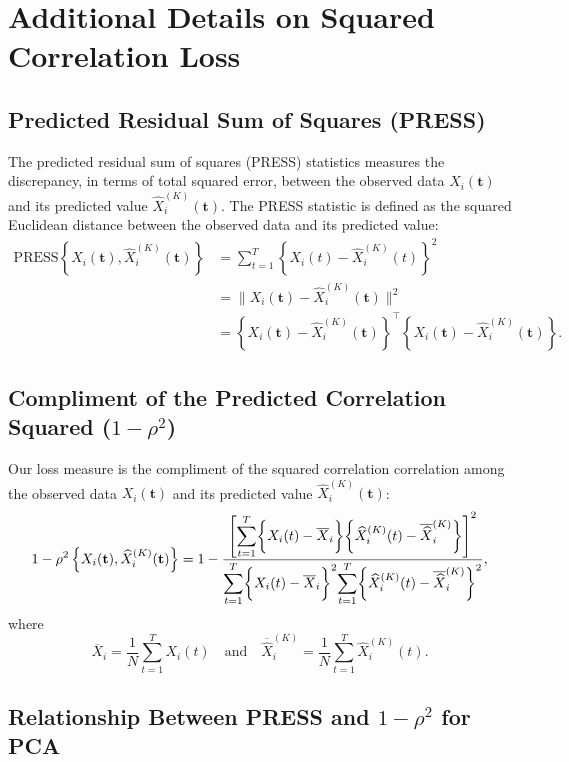 \section{Additional Details on Squared Correlation Loss} \label{sec:squared-correlation}


\subsection{Predicted Residual Sum of Squares (PRESS)}

The predicted residual sum of squares (PRESS) statistics measures the discrepancy, in terms of total squared error, between the observed data $X_i (\mathbf{t})$ and its predicted value $\widehat{X}^{(K)}_{i} (\mathbf{t})$. 
The PRESS statistic is defined as the squared Euclidean distance between the observed data and its predicted value:
\begin{align*}
    \text{PRESS}\left\{X_i (\mathbf{t}), \widehat{X}^{(K)}_{i} (\mathbf{t}) \right\} 
&= 
\sum_{t = 1}^T \left\{ X_{i}(t) - \widehat{X}^{(K)}_{i} (t)\right\}^2 \\
&=
\bigg\| X_i (\mathbf{t}) - \widehat{X}^{(K)}_{i} (\mathbf{t}) \bigg\|^2\\
&=
\left\{X_i (\mathbf{t}) - \widehat{X}^{(K)}_{i} (\mathbf{t})\right\}^\top \left\{X_i (\mathbf{t}) - \widehat{X}^{(K)}_{i} (\mathbf{t})\right\}.
\end{align*}

\subsection{Compliment of the Predicted Correlation Squared ($1-\rho^2$)}

Our loss measure is the compliment of the squared correlation correlation among the observed data $X_i (\mathbf{t})$ and its predicted value $\widehat{X}^{(K)}_{i} (\mathbf{t})$:
$$
1- \rho^2 \left\{X_i (\mathbf{t}), \widehat{X}^{(K)}_{i} (\mathbf{t}) \right\} =
1 - \frac{\left[ \mathlarger{\sum}_{t = 1}^T{\bigg\{X_i (t) - \overline{X}_i \bigg\} \bigg\{ \widehat{X}_i^{(K)} (t) - \overline{\widehat{X}}_i^{(K)} \bigg\}} \right]^2}{\mathlarger{\sum}_{t = 1}^T \bigg\{X_i (t) - \overline{X}_i \bigg\}^2 \mathlarger{\sum}_{t = 1}^T \bigg\{ \widehat{X}_i^{(K)} (t) - \overline{\widehat{X}}_i^{(K)} \bigg\} ^2},
$$
where
$$
\overline{X}_i = \frac{1}{N} \sum_{t=1}^T X_i (t) \quad \text{and} \quad \overline{\widehat{X}}_i^{(K)} = \frac{1}{N} \sum_{t=1}^T \widehat{X}_i^{(K)} (t).
$$

\subsection{Relationship Between PRESS and $1-\rho^2$ for PCA}

